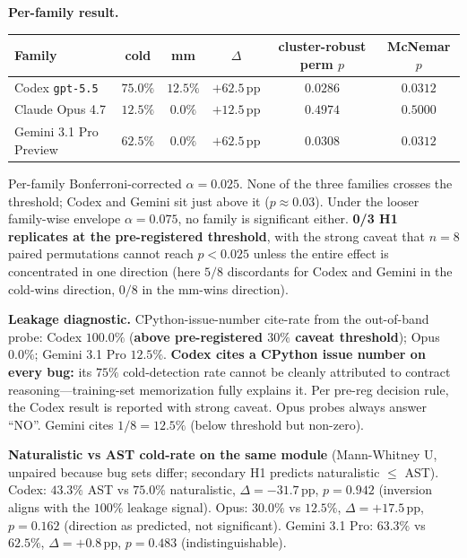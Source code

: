 \textbf{Per-family result.}

\begin{center}
\small
\begin{tabular}{@{}lccccc@{}}
\toprule
Family & cold & mm & $\Delta$ & cluster-robust perm $p$ & McNemar $p$ \\
\midrule
Codex \texttt{gpt-5.5} & $75.0\%$ & $12.5\%$ & $+62.5\,\mathrm{pp}$ & $0.0286$ & $0.0312$ \\
Claude Opus 4.7 & $12.5\%$ & $0.0\%$ & $+12.5\,\mathrm{pp}$ & $0.4974$ & $0.5000$ \\
Gemini 3.1 Pro Preview & $62.5\%$ & $0.0\%$ & $+62.5\,\mathrm{pp}$ & $0.0308$ & $0.0312$ \\
\bottomrule
\end{tabular}
\end{center}

Per-family Bonferroni-corrected $\alpha = 0.025$. None of the three families crosses the threshold; Codex and Gemini sit just above it ($p \approx 0.03$). Under the looser family-wise envelope $\alpha = 0.075$, no family is significant either. \textbf{0/3 H1 replicates at the pre-registered threshold}, with the strong caveat that $n = 8$ paired permutations cannot reach $p < 0.025$ unless the entire effect is concentrated in one direction (here $5/8$ discordants for Codex and Gemini in the cold-wins direction, $0/8$ in the mm-wins direction).

\textbf{Leakage diagnostic.} CPython-issue-number cite-rate from the out-of-band probe: Codex $100.0\%$ (\textbf{above pre-registered $30\%$ caveat threshold}); Opus $0.0\%$; Gemini 3.1 Pro $12.5\%$. \textbf{Codex cites a CPython issue number on every bug:} its $75\%$ cold-detection rate cannot be cleanly attributed to contract reasoning---training-set memorization fully explains it. Per pre-reg decision rule, the Codex result is reported with strong caveat. Opus probes always answer ``NO''. Gemini cites $1/8 = 12.5\%$ (below threshold but non-zero).

\textbf{Naturalistic vs AST cold-rate on the same module} (Mann-Whitney U, unpaired because bug sets differ; secondary H1 predicts naturalistic $\le$ AST). Codex: $43.3\%$ AST vs $75.0\%$ naturalistic, $\Delta = -31.7\,\mathrm{pp}$, $p = 0.942$ (inversion aligns with the $100\%$ leakage signal). Opus: $30.0\%$ vs $12.5\%$, $\Delta = +17.5\,\mathrm{pp}$, $p = 0.162$ (direction as predicted, not significant). Gemini 3.1 Pro: $63.3\%$ vs $62.5\%$, $\Delta = +0.8\,\mathrm{pp}$, $p = 0.483$ (indistinguishable).


